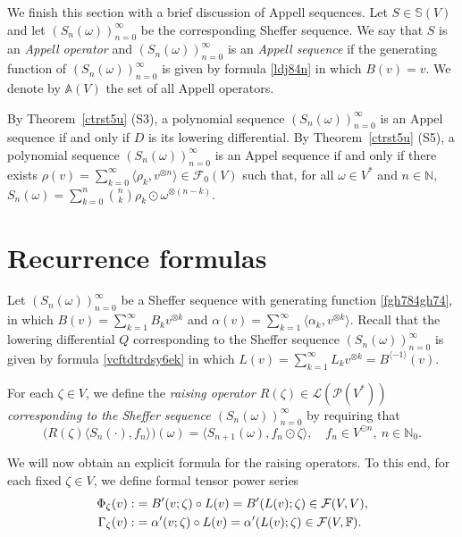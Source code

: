 \documentclass[12pt]{article}
\theoremstyle{remark}
\theoremstyle{remark}
\theoremstyle{remark}
\begin{document}
We finish this section with a brief discussion of Appell sequences. Let $S\in\mathbb S(V)$ and let $(S_n(\omega))_{n=0}^\infty$ be the corresponding Sheffer sequence. We say that $S$  is an {\it Appell operator} and $(S_n(\omega))_{n=0}^\infty$ is an {\it Appell sequence} if the generating function of $(S_n(\omega))_{n=0}^\infty$ is given by formula \eqref{ldj84n} in which $B(v)=v$.  We denote by $\mathbb A(V)$ the set of all Appell operators.

By Theorem~\ref{ctrst5u} (S3), a polynomial sequence $(S_n(\omega))_{n=0}^\infty$ is an Appel sequence if and only if $D$ is its lowering differential.
By Theorem~\ref{ctrst5u} (S5), a polynomial sequence $(S_n(\omega))_{n=0}^\infty$ is an Appel sequence if and only if there exists $\rho(v)=\sum_{k=0}^\infty \langle \rho_k, v^{\otimes n}\rangle\in \mathcal F_0(V)$ such that, for all $\omega \in V^*$  and $n \in \mathbb N$,
$S_n(\omega) =\sum_{k=0}^n{n \choose k}
\rho_k\odot \omega^{\otimes (n-k)}$. 


\section{Recurrence formulas}\label{cxdzrzrzarwar}

 Let $(S_n(\omega))_{n=0}^\infty$ be a Sheffer sequence with generating function \eqref{fgh784gh74}, in which $B(v)=\sum_{k=1}^\infty B_kv^{\otimes k}$ and $\alpha(v)=\sum_{k=1}^\infty\langle \alpha_k,v^{\otimes k}\rangle$.   
 Recall that the lowering differential $Q$ corresponding to the Sheffer sequence $(S_n(\omega))_{n=0}^\infty$ is given by formula \eqref{vcftdtrdsy6ek} in which $L(v)=\sum_{k=1}^\infty L_kv^{\otimes k}=B^{\langle-1\rangle}(v)$. 
 
 
 For each $\zeta\in V$, we define the 
 {\it raising  operator $R(\zeta)\in \mathcal L(\mathcal P  (V^*))$ corresponding to the Sheffer sequence $(S_n(\omega))_{n=0}^\infty$}  by requiring that 
 $$\big(R(\zeta)\langle S_n(\cdot),f_n\rangle\big)(\omega)=\langle S_{n+1}(\omega),f_n\odot \zeta\rangle,\quad f_n\in V^{\odot n},\ n\in\mathbb N_0.$$

We will now obtain  an explicit formula for the raising 
  operators. To this end, for each fixed $\zeta\in V$, we define formal tensor power series 
\begin{align}
\Phi_\zeta(v):&=B'(v;\zeta)\circ L(v)=B'(L(v);\zeta)\in\mathcal F(V,V),\notag\\
\Gamma_\zeta(v):&=\alpha'(v;\zeta)\circ L(v)=\alpha'(L(v);\zeta)\in\mathcal F(V,\mathbb F). 
\label{vcrdr6ts5a43aa}\end{align}
\end{document}
